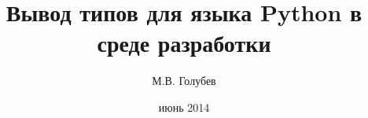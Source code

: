 \documentclass[a4paper,14pt]{csse-fcs}
\begin{document}
\title{Вывод типов для языка Python в среде разработки}
\author{М.В. Голубев}
\date{июнь 2014}
\maketitle

\tableofcontents


% 
% 
% 
% 
% 
% 


\end{document}
